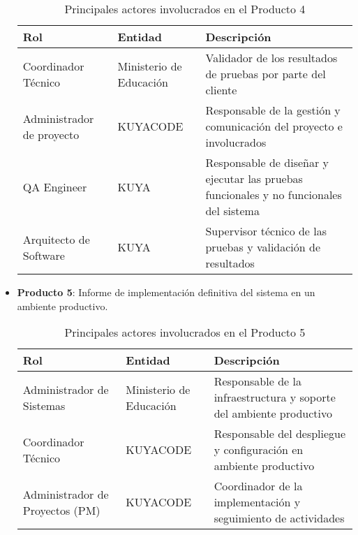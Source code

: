 \begin{itemize}
    \begin{table}[htbp]
        \centering
        \begin{tabular}{|p{3cm}|p{5cm}|p{7cm}|}
            \hline
            \textbf{Rol} & \textbf{Entidad} & \textbf{Descripción} \\
            \hline
            Coordinador Técnico & Ministerio de Educación & Validador de los resultados de pruebas por parte del cliente \\
            \hline
            Administrador de proyecto & KUYACODE & Responsable de la gestión y comunicación del proyecto e involucrados \\
            \hline
            QA Engineer & KUYA & Responsable de diseñar y ejecutar las pruebas funcionales y no funcionales del sistema \\
            \hline
            Arquitecto de Software & KUYA & Supervisor técnico de las pruebas y validación de resultados \\
            \hline
        \end{tabular}
        \caption{Principales actores involucrados en el Producto 4}
        \label{tab:actores_producto4}
    \end{table}

    \item \textbf{Producto 5}: Informe de implementación definitiva del sistema en un ambiente productivo.\\
    
    \begin{table}[h]            
        \centering
        \begin{tabular}{|p{3cm}|p{5cm}|p{7cm}|}
            \hline
            \textbf{Rol} & \textbf{Entidad} & \textbf{Descripción} \\
            \hline
            Administrador de Sistemas & Ministerio de Educación & Responsable de la infraestructura y soporte del ambiente productivo \\
            \hline
            Coordinador Técnico & KUYACODE & Responsable del despliegue y configuración en ambiente productivo \\
            \hline
            Administrador de Proyectos (PM) & KUYACODE & Coordinador de la implementación y seguimiento de actividades \\
            \hline
        \end{tabular}   
        \caption{Principales actores involucrados en el Producto 5}
        \label{tab:actores_producto5}
    \end{table}


\end{itemize}
